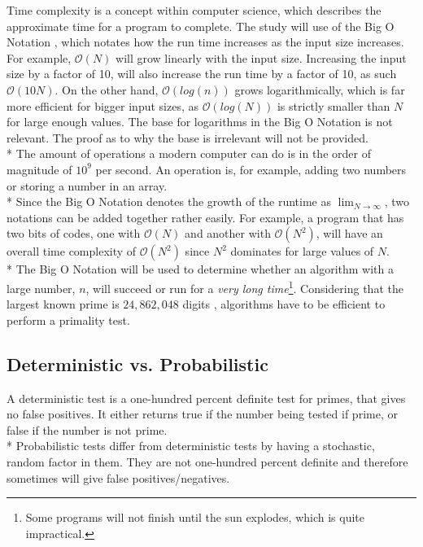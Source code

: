 \documentclass[main.tex]{subfiles}
\begin{document}
Time complexity \cite{theorem:time_comp} is a concept within computer science,
which describes the approximate time for a program to complete. The study will
use of the Big O Notation \cite{theorem:big_O}, which notates how the run time
increases as the input size increases. For example, $\mathcal{O}(N)$ will grow linearly
with the input size. Increasing the input size by a factor of 10, will also
increase the run time by a factor of 10, as such $\mathcal{O}(10N)$. On the other hand,
$\mathcal{O}(log(n))$ grows logarithmically, which is far more efficient for bigger input
sizes, as $\mathcal{O}(log(N))$ is strictly smaller than $N$ for large enough values. The
base for logarithms in the Big O Notation is not relevant. The proof as to why
the base is irrelevant will not be provided. \newline
\\*
The amount of operations a modern computer can do is in the order of magnitude
of $10^{9}$ per second. An operation is, for example, adding two numbers or
storing a number in an array. \newline
\\*
Since the Big O Notation denotes the growth of the runtime as
$\lim_{N\to\infty}$, two notations can be added together rather easily. For
example, a program that has two bits of codes, one with $\mathcal{O}(N)$ and another with
$\mathcal{O}(N^{2})$, will have an overall time complexity of $\mathcal{O}(N^{2})$ since $N^{2}$
dominates for large values of $N$. \newline
\\*
The Big O Notation will be used to determine whether an algorithm with a large
number, $n$, will succeed or run for a \textit{very long time}\footnote{Some
  programs will not finish until the sun explodes, which is quite impractical.}.
Considering that the largest known prime is $24,862,048$ digits
\cite{prime:largest_digits}, algorithms have to be efficient to perform a
primality test.

\subsection{Deterministic vs. Probabilistic}
A deterministic test is a one-hundred percent definite test for primes, that
gives no false positives. It either returns true if the number being tested if
prime, or false if the number is not prime. \newline
\\*
Probabilistic tests differ from deterministic tests by having a stochastic,
random factor in them. They are not one-hundred percent definite and therefore
sometimes will give false positives/negatives.
\end{document}
